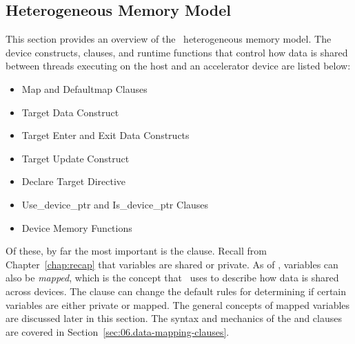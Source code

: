 \subsection{Heterogeneous Memory Model}
\label{ssec:06.heterogeneous-memory-model}

This section provides an overview of the \OMP\ heterogeneous memory model.
The device constructs, clauses, and runtime functions that control how data is shared
between threads executing on the host and an accelerator device are listed below:

\begin{itemize}
  \item Map and Defaultmap Clauses
  \item Target Data Construct
  \item Target Enter and Exit Data Constructs
  \item Target Update Construct
  \item Declare Target Directive
  \item Use\_device\_ptr and Is\_device\_ptr Clauses
  \item Device Memory Functions
\end{itemize}

Of these, by far the most important is the  clause.  Recall from
Chapter~\ref{chap:recap} that variables are shared or private.  As of \OMPfourzero,
variables can also be \emph{mapped}, which is the concept that \OMP\ uses to
describe how data is shared across devices.  The  clause can
change the default rules for determining if certain variables are either
private or mapped.  The general concepts of mapped variables
are discussed later in this section.  
The syntax and mechanics of the  and  clauses
are covered in Section~\ref{sec:06.data-mapping-clauses}.

